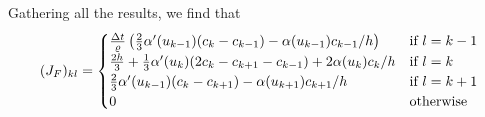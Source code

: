 \documentclass[12pt]{article}
\begin{document}
Gathering all the results, we find that 
\begin{align}
 (J_F)_{kl} = \begin{cases} {\Delta t \over \varrho}\left(\frac{2}{3}\alpha'(u_{k-1})(c_k - c_{k-1})  -\alpha(u_{k-1})c_{k-1}/h\right) & \text{if } l = k-1 \\ {2h \over 3} + \frac{1}{3}\alpha'(u_{k})(2c_k - c_{k+1}- c_{k-1}) + 2\alpha(u_{k})c_{k}/h & \text{if } l = k \\ \frac{2}{3}\alpha'(u_{k-1})(c_k - c_{k+1}) -\alpha(u_{k+1})c_{k+1}/h & \text{if } l = k+1 \\ 0 & \text{otherwise}  \end{cases}
\end{align}
\end{document}
